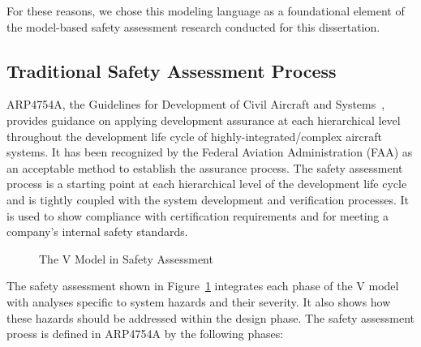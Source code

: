 For these reasons, we chose this modeling language as a foundational element of the model-based safety assessment research conducted for this dissertation.


\subsection{Traditional Safety Assessment Process}
ARP4754A, the Guidelines for Development of Civil Aircraft and Systems~\cite{SAE:ARP4754A}, provides guidance on applying development assurance at each hierarchical level throughout the development life cycle of highly-integrated/complex aircraft systems. It has been recognized by the Federal Aviation Administration (FAA) as an acceptable method to establish the assurance process. The safety assessment process is a starting point at each hierarchical level of the development life cycle and is tightly coupled with the system development and verification processes. It is used to show compliance with certification requirements and for meeting a company's internal safety standards. 

\begin{figure}[!htb]
        \caption{\label{fig:v2} The V Model in Safety Assessment}
\end{figure}

The safety assessment shown in Figure~\ref{fig:v2} integrates each phase of the V model with analyses specific to system hazards and their severity. It also shows how these hazards should be addressed within the design phase. The safety assessment proess is defined in ARP4754A by the following phases:

